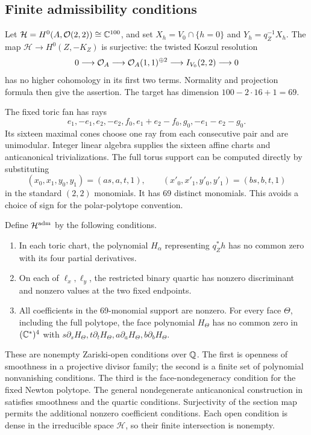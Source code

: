\subsection{Finite admissibility conditions}

Let $\mathcal H=H^0(A,\mathcal O(2,2))\cong\mathbb C^{100}$, and set
$X_h=V_0\cap\{h=0\}$ and $Y_h=q_Z^{-1}X_h$.
The map $\mathcal H\to H^0(Z,-K_Z)$ is surjective: the twisted
Koszul resolution
\[
 0\longrightarrow\mathcal O_A\longrightarrow\mathcal O_A(1,1)^{\oplus2}
            \longrightarrow I_{V_0}(2,2)\longrightarrow0
\]
has no higher cohomology in its first two terms. Normality and
projection formula then give the assertion. The target has dimension
$100-2\cdot16+1=69$.

The fixed toric fan has rays
\begin{equation}\label{eq:toric-rays}
 e_1,-e_1,e_2,-e_2,f_0,e_1+e_2-f_0,g_0,-e_1-e_2-g_0.
\end{equation}
Its sixteen maximal cones choose one ray from each consecutive
pair and are unimodular. Integer linear algebra supplies the
sixteen affine charts and anticanonical trivializations. The full
torus support can be computed directly by substituting
\begin{equation}\label{eq:torus-substitution}
 (x_0,x_1,y_0,y_1)=(as,a,t,1),\qquad
 (x'_0,x'_1,y'_0,y'_1)=(bs,b,t,1)
\end{equation}
in the standard $(2,2)$ monomials. It has 69 distinct monomials.
This avoids a choice of sign for the polar-polytope convention.

Define $\mathcal H^{\rm adm}$ by the following conditions.
\begin{enumerate}
\item In each toric chart, the polynomial $H_\alpha$ representing
      $q_Z^*h$ has no common zero with its four partial derivatives.
\item On each of $\ell_x,\ell_y$, the restricted binary quartic has
      nonzero discriminant and nonzero values at the two fixed endpoints.
\item All coefficients in the 69-monomial support are nonzero. For
      every face $\Theta$, including the full polytope, the face
      polynomial $H_\Theta$ has no common zero in $(\mathbb C^*)^4$ with
      $s\partial_sH_\Theta,t\partial_tH_\Theta,
       a\partial_aH_\Theta,b\partial_bH_\Theta$.
\end{enumerate}
These are nonempty Zariski-open conditions over $\mathbb Q$. The first
is openness of smoothness in a projective divisor family; the
second is a finite set of polynomial nonvanishing conditions.
The third is the face-nondegeneracy condition for the fixed Newton
polytope. The general nondegenerate anticanonical construction in
\cite[Appendix~A]{W_Toric} satisfies smoothness and the quartic
conditions. Surjectivity of the section map permits the additional
nonzero coefficient conditions. Each open condition is dense in the
irreducible space $\mathcal H$, so their finite intersection is nonempty.

